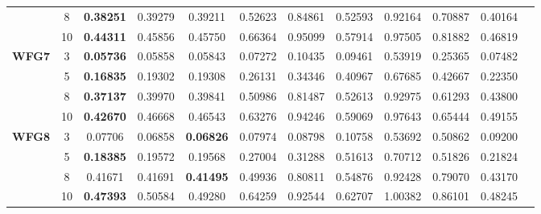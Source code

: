 \documentclass{sig-alternate}
\begin{document}
\begin{table}[!htb]
\begin{tabular}{|c|c|c|c|c|c|c|c|c|c|c|c|}
		& 8          & \textbf{0.38251} & 0.39279           & 0.39211               & 0.52623          & 0.84861             & 0.52593             & 0.92164            & 0.70887              & 0.40164          \\ \cline{2-11} 
		& 10         & \textbf{0.44311} & 0.45856           & 0.45750               & 0.66364          & 0.95099             & 0.57914             & 0.97505            & 0.81882              & 0.46819          \\ \hline
		\multirow{4}{*}{\textbf{WFG7}}  & 3          & \textbf{0.05736} & 0.05858           & 0.05843               & 0.07272          & 0.10435             & 0.09461             & 0.53919            & 0.25365              & 0.07482          \\ \cline{2-11} 
		& 5          & \textbf{0.16835} & 0.19302           & 0.19308               & 0.26131          & 0.34346             & 0.40967             & 0.67685            & 0.42667              & 0.22350          \\ \cline{2-11} 
		& 8          & \textbf{0.37137} & 0.39970           & 0.39841               & 0.50986          & 0.81487             & 0.52613             & 0.92975            & 0.61293              & 0.43800          \\ \cline{2-11} 
		& 10         & \textbf{0.42670} & 0.46668           & 0.46543               & 0.63276          & 0.94246             & 0.59069             & 0.97643            & 0.65444              & 0.49155          \\ \hline
		\multirow{4}{*}{\textbf{WFG8}}  & 3          & 0.07706          & 0.06858           & \textbf{0.06826}      & 0.07974          & 0.08798             & 0.10758             & 0.53692            & 0.50862              & 0.09200          \\ \cline{2-11} 
		& 5          & \textbf{0.18385} & 0.19572           & 0.19568               & 0.27004          & 0.31288             & 0.51613             & 0.70712            & 0.51826              & 0.21824          \\ \cline{2-11} 
		& 8          & 0.41671          & 0.41691           & \textbf{0.41495}      & 0.49936          & 0.80811             & 0.54876             & 0.92428            & 0.79070              & 0.43170          \\ \cline{2-11} 
		& 10         & \textbf{0.47393} & 0.50584           & 0.49280               & 0.64259          & 0.92544             & 0.62707             & 1.00382            & 0.86101              & 0.48245          \\ \hline

\end{tabular}
\end{table}
\end{document}
